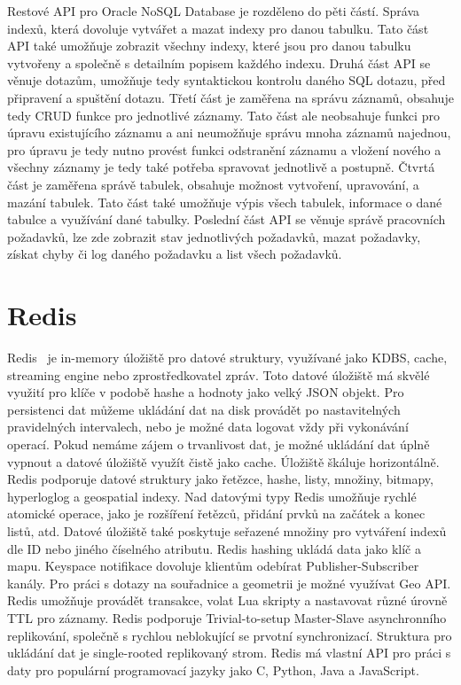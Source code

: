 \documentclass[czech,master,dept460,male,csharp,cpdeclaration]{diploma}
\begin{document}
	Restové API pro Oracle NoSQL Database je rozděleno do pěti částí. Správa indexů, která dovoluje vytvářet a mazat indexy pro danou tabulku. Tato část API také umožňuje zobrazit všechny indexy, které jsou pro danou tabulku vytvořeny a společně s detailním popisem každého indexu. Druhá část API se věnuje dotazům, umožňuje tedy syntaktickou kontrolu daného SQL dotazu, před připravení a spuštění dotazu. Třetí část je zaměřena na správu záznamů, obsahuje tedy CRUD funkce pro jednotlivé záznamy. Tato část ale neobsahuje funkci pro úpravu existujícího záznamu a ani neumožňuje správu mnoha záznamů najednou, pro úpravu je tedy nutno provést funkci odstranění záznamu a vložení nového a všechny záznamy je tedy také potřeba spravovat jednotlivě a postupně. Čtvrtá část je zaměřena správě tabulek, obsahuje možnost vytvoření, upravování, a mazání tabulek. Tato část také umožňuje výpis všech tabulek, informace o dané tabulce a využívání dané tabulky. Poslední část API se věnuje správě pracovních požadavků, lze zde zobrazit stav jednotlivých požadavků, mazat požadavky, získat chyby či log daného požadavku a list všech požadavků.
		
	\section{Redis} \label{lab-redis}
	
	Redis~\cite{redis} je in-memory úložiště pro datové struktury, využívané jako KDBS, cache, streaming engine nebo zprostředkovatel zpráv. Toto datové úložiště má skvělé využití pro klíče v podobě hashe a hodnoty jako velký JSON objekt. Pro persistenci dat můžeme ukládání dat na disk provádět po nastavitelných pravidelných intervalech, nebo je možné data logovat vždy při vykonávání operací. Pokud nemáme zájem o trvanlivost dat, je možné ukládání dat úplně vypnout a datové úložiště využít čistě jako cache. Úložiště škáluje horizontálně. Redis podporuje datové struktury jako řetězce, hashe, listy, množiny, bitmapy, hyperloglog a geospatial indexy. Nad datovými typy Redis umožňuje rychlé atomické operace, jako je rozšíření řetězců, přidání prvků na začátek a konec listů, atd. Datové úložiště také poskytuje seřazené množiny pro vytváření indexů dle ID nebo jiného číselného atributu. Redis hashing ukládá data jako klíč a mapu. Keyspace notifikace dovoluje klientům odebírat Publisher-Subscriber kanály. Pro práci s dotazy na souřadnice a geometrii je možné využívat Geo API. Redis umožňuje provádět transakce, volat Lua skripty a nastavovat různé úrovně TTL pro záznamy. Redis podporuje Trivial-to-setup Master-Slave asynchronního replikování, společně s rychlou neblokující se prvotní synchronizací. Struktura pro ukládání dat je single-rooted replikovaný strom. Redis má vlastní API pro práci s daty pro populární programovací jazyky jako C, Python, Java a JavaScript.
	
\end{document}
